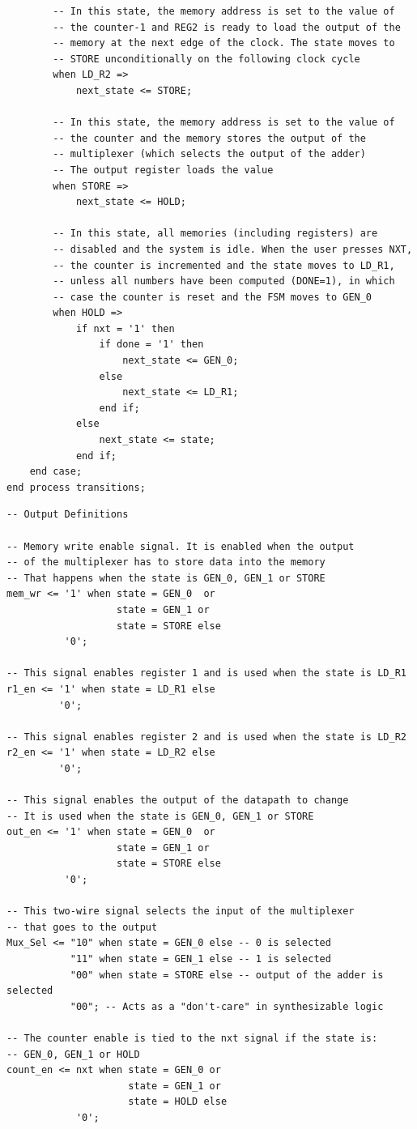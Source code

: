 \documentclass[10pt]{article}
\begin{document}
        \newpage
        \begin{verbatim}
        -- In this state, the memory address is set to the value of 
        -- the counter-1 and REG2 is ready to load the output of the
        -- memory at the next edge of the clock. The state moves to 
        -- STORE unconditionally on the following clock cycle
        when LD_R2 =>
            next_state <= STORE;
            
        -- In this state, the memory address is set to the value of
        -- the counter and the memory stores the output of the
        -- multiplexer (which selects the output of the adder) 
        -- The output register loads the value
        when STORE =>
            next_state <= HOLD;
            
        -- In this state, all memories (including registers) are 
        -- disabled and the system is idle. When the user presses NXT,
        -- the counter is incremented and the state moves to LD_R1,
        -- unless all numbers have been computed (DONE=1), in which
        -- case the counter is reset and the FSM moves to GEN_0
        when HOLD =>
            if nxt = '1' then
                if done = '1' then
                    next_state <= GEN_0;
                else
                    next_state <= LD_R1;
                end if;
            else
                next_state <= state;
            end if;
    end case;
end process transitions;
\end{verbatim}
\newpage
\begin{verbatim}
-- Output Definitions

-- Memory write enable signal. It is enabled when the output 
-- of the multiplexer has to store data into the memory 
-- That happens when the state is GEN_0, GEN_1 or STORE
mem_wr <= '1' when state = GEN_0  or
                   state = GEN_1 or
                   state = STORE else
          '0';

-- This signal enables register 1 and is used when the state is LD_R1
r1_en <= '1' when state = LD_R1 else
         '0';

-- This signal enables register 2 and is used when the state is LD_R2
r2_en <= '1' when state = LD_R2 else
         '0';

-- This signal enables the output of the datapath to change 
-- It is used when the state is GEN_0, GEN_1 or STORE
out_en <= '1' when state = GEN_0  or
                   state = GEN_1 or
                   state = STORE else
          '0';
          
-- This two-wire signal selects the input of the multiplexer 
-- that goes to the output
Mux_Sel <= "10" when state = GEN_0 else -- 0 is selected
           "11" when state = GEN_1 else -- 1 is selected
           "00" when state = STORE else -- output of the adder is selected
           "00"; -- Acts as a "don't-care" in synthesizable logic

-- The counter enable is tied to the nxt signal if the state is: 
-- GEN_0, GEN_1 or HOLD
count_en <= nxt when state = GEN_0 or   
                     state = GEN_1 or
                     state = HOLD else
            '0';
\end{verbatim}
\end{document}
